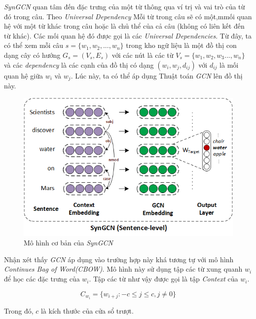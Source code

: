 \textit{SynGCN} quan tâm đến đặc trưng của một từ thông qua ví trị và vai trò của từ đó trong câu. Theo \textit{Universal Dependency} \cite{2020arXiv200410643N} Mỗi từ trong câu sẽ có một,mmối quan hệ với một từ khác trong câu hoặc là chủ thể của cả câu (không có liên kết đến từ khác). Các mối quan hệ đó được gọi là các \textit{Universal Dependencies}. Từ đây, ta có thể xem mỗi câu $s = \{w_1, w_2,...,w_n\}$ trong kho ngữ liệu là một đồ thị con dạng cây có hướng $G_s = (V_s, E_s)$ với các nút là các từ $V_s=\{w_1, w_2, w_3...,w_n\}$ và các \textit{dependency} là các cạnh của đồ thị có dạng $(w_i, w_j, d_{ij})$ với $d_{ij}$ là mối quan hệ giữa $w_i$ và $w_j$. Lúc này, ta có thể áp dụng Thuật toán \textit{GCN} lên đồ thị này. 

\begin{figure}[H]
    \begin{center}
        \includegraphics[scale=1.0]{images/syngcn_model}
        \caption{Mô hình cơ bản của \textit{SynGCN} \cite{wordgcn2019}}
        \label{fig:syngcn}
    \end{center}
\end{figure}


Nhận xét thấy \textit{GCN} áp dụng vào trường hợp này khá tương tự với mô hình \textit{Continues Bag of Word(CBOW)}. Mô hình này sử dụng tập các từ xung quanh $w_i$ để học các đặc trưng của $w_i$. Tập các từ như vậy được gọi là tập \textit{Context} của $w_i$.

\begin{equation*}
	C_{w_i} = \{w_{i+j}: -c \leq j \leq c, j \neq 0\}
\end{equation*}

Trong đó, $c$ là kích thước của cửa sổ trượt.

